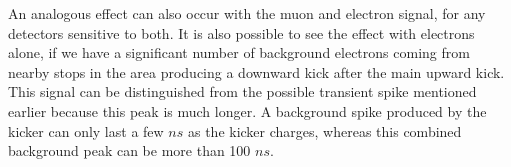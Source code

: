 An analogous effect can also occur with the muon and electron signal, for any detectors sensitive to both.
It is also possible to see the effect with electrons alone, if we have a significant number of background electrons coming from nearby stops in the area producing a downward kick after the main upward kick.
This signal can be distinguished from the possible transient spike mentioned earlier because this peak is much longer.  
A background spike produced by the kicker can only last a few $ns$ as the kicker charges, whereas this combined background peak can be more than 100 $ns$.